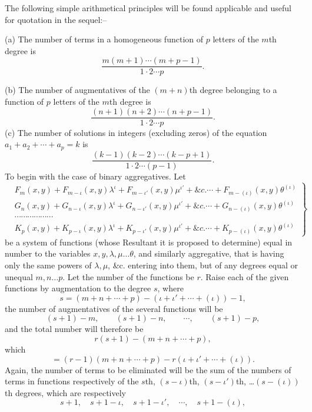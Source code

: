 \documentclass[11pt]{article}
\newcommand{\sourcepage}[1]{\marginpar{\scriptsize p.~#1}}
\begin{document}
{{The following simple arithmetical principles will be found applicable and useful for quotation in the sequel:--

(a) The number of terms in a homogeneous function of $p$ letters of the $m$th degree is
\[
\frac{m(m+1)\cdots(m+p-1)}{1\cdot2\cdots p}.
\]

\sourcepage{258}
(b) The number of augmentatives of the $(m+n)$th degree belonging to a function of $p$ letters of the $m$th degree is
\[
\frac{(n+1)(n+2)\cdots(n+p-1)}{1\cdot2\cdots p}.
\]
(c) The number of solutions in integers (excluding zeros) of the equation $a_1+a_2+\cdots+a_p=k$ is
\[
\frac{(k-1)(k-2)\cdots(k-p+1)}{1\cdot2\cdots(p-1)}.
\]
To begin with the case of binary aggregatives. Let
\[
\left.
\begin{aligned}
&F_m(x,y)+F_{m-\iota}(x,y)\lambda^\iota+F_{m-\iota'}(x,y)\mu^{\iota'}+\&c.\cdots+F_{m-(\iota)}(x,y)\theta^{(\iota)}\\
&G_n(x,y)+G_{n-\iota}(x,y)\lambda^\iota+G_{n-\iota'}(x,y)\mu^{\iota'}+\&c.\cdots+G_{n-(\iota)}(x,y)\theta^{(\iota)}\\
&\cdots\cdots\cdots\cdots\cdots\cdots\\
&K_p(x,y)+K_{p-\iota}(x,y)\lambda^\iota+K_{p-\iota'}(x,y)\mu^{\iota'}+\&c.\cdots+K_{p-(\iota)}(x,y)\theta^{(\iota)}
\end{aligned}
\right\}\tag{A}
\]
be a system of functions (whose Resultant it is proposed to determine) equal in number to the variables $x,y,\lambda,\mu\ldots\theta$, and similarly aggregative, that is having only the same powers of $\lambda,\mu$, \&c. entering into them, but of any degrees equal or unequal $m,n\ldots p$. Let the number of the functions be $r$. Raise each of the given functions by augmentation to the degree $s$, where
\[
s=(m+n+\cdots+p)-(\iota+\iota'+\cdots+(\iota))-1,
\]
the number of augmentatives of the several functions will be
\[
(s+1)-m,
\qquad (s+1)-n,
\qquad \cdots,
\qquad (s+1)-p,
\]
and the total number will therefore be
\[
r(s+1)-(m+n+\cdots+p),
\]
which
\[
=(r-1)(m+n+\cdots+p)-r(\iota+\iota'+\cdots+(\iota)).
\]
Again, the number of terms to be eliminated will be the sum of the numbers of terms in functions respectively of the $s$th, $(s-\iota)$th, $(s-\iota')$th, \ldots $(s-(\iota))$th degrees, which are respectively
\[
s+1,
\quad s+1-\iota,
\quad s+1-\iota',
\quad \cdots,
\quad s+1-(\iota),
\]

}}
\end{document}
